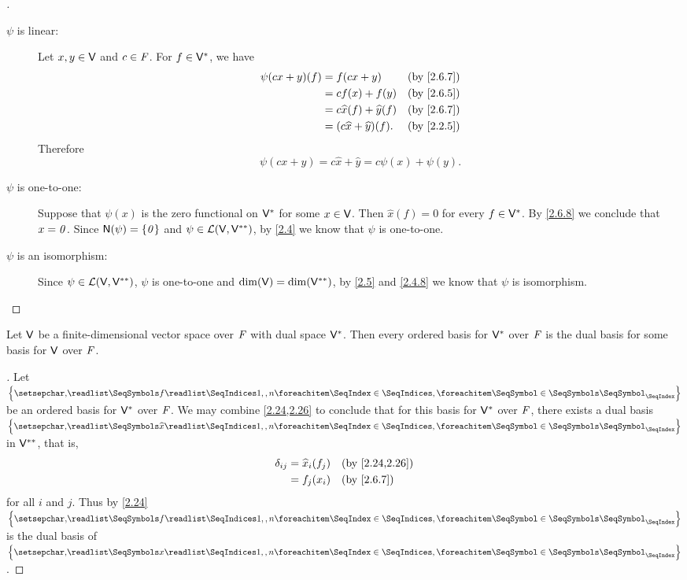 \begin{proof}[]
  \begin{description}
    \item[\(\psi\) is linear:]
      Let \(x, y \in \mathsf{V}\) and \(c \in \mathit{F}\).
      For \(f \in \mathsf{V}^*\), we have
      \begin{align*}
        \psi(cx + y)(f) & = f(cx + y)                         &  & \text{(by \cref{2.6.7})} \\
                        & = cf(x) + f(y)                      &  & \text{(by \cref{2.6.5})} \\
                        & = c \widehat{x}(f) + \widehat{y}(f) &  & \text{(by \cref{2.6.7})} \\
                        & = (c \widehat{x} + \widehat{y})(f). &  & \text{(by \cref{2.2.5})}
      \end{align*}
      Therefore
      \[
        \psi(cx + y) = c \widehat{x} + \widehat{y} = c \psi(x) + \psi(y).
      \]
    \item[\(\psi\) is one-to-one:]
      Suppose that \(\psi(x)\) is the zero functional on \(\mathsf{V}^*\) for some \(x \in \mathsf{V}\).
      Then \(\widehat{x}(f) = 0\) for every \(f \in \mathsf{V}^*\).
      By \cref{2.6.8} we conclude that \(x = \mathit{0}\).
      Since \(\ns{\psi} = \set{\zv}\) and \(\psi \in \mathcal{L}(\mathsf{V}, \mathsf{V}^{**})\), by \cref{2.4} we know that \(\psi\) is one-to-one.
    \item[\(\psi\) is an isomorphism:]
      Since \(\psi \in \mathcal{L}(\mathsf{V}, \mathsf{V}^{**})\), \(\psi\) is one-to-one and \(\dim(\mathsf{V}) = \dim(\mathsf{V}^{**})\), by \cref{2.5} and \cref{2.4.8} we know that \(\psi\) is isomorphism.
  \end{description}
\end{proof}

\begin{cor}\label{2.6.9}
  Let \(\mathsf{V}\) be a finite-dimensional vector space over \(\mathit{F}\) with dual space \(\mathsf{V}^*\).
  Then every ordered basis for \(\mathsf{V}^*\) over \(\mathit{F}\) is the dual basis for some basis for \(\mathsf{V}\) over \(\mathit{F}\).
\end{cor}

\begin{proof}[]
  Let \(\set{\seq{f}{1,,n}}\) be an ordered basis for \(\mathsf{V}^*\) over \(\mathit{F}\).
  We may combine \cref{2.24,2.26} to conclude that for this basis for \(\mathsf{V}^*\) over \(\mathit{F}\), there exists a dual basis \(\set{\seq{\widehat{x}}{1,,n}}\) in \(\mathsf{V}^{**}\), that is,
  \begin{align*}
    \delta_{i j} & = \widehat{x}_i(f_j) &  & \text{(by \cref{2.24,2.26})} \\
                 & = f_j(x_i)           &  & \text{(by \cref{2.6.7})}
  \end{align*}
  for all \(i\) and \(j\).
  Thus by \cref{2.24} \(\set{\seq{f}{1,,n}}\) is the dual basis of \(\set{\seq{x}{1,,n}}\).
\end{proof}

